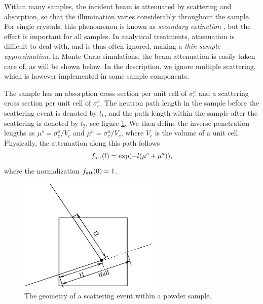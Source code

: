 Within many samples,
the incident beam is attenuated by scattering and absorption,
so that the illumination varies considerably throughout the sample.
For single crystals, this phenomenon is known as
{\em secondary extinction} \cite{bacon}, but the effect is
important for all samples.
In analytical treatments, attenuation is difficult to deal with,
and is thus often ignored, making a {\em thin sample approximation}.
In Monte Carlo simulations, the beam attenuation
is easily taken care of, as will be shown below.
In the description, we ignore multiple scattering, which is however
 implemented in some sample components.

The sample has an absorption cross section per unit cell of
$\sigma_c^a$ and a scattering cross section per unit cell
of $\sigma_c^s$. The neutron path length
in the sample before the scattering event is denoted by $l_1$, and
the path length within the sample after the scattering
is denoted by $l_2$, see figure \ref{powderFig}.
We then define the inverse penetration lengths as
$\mu^s = \sigma_c^s / V_c$ and $\mu^a = \sigma_c^a / V_c$, where
$V_c$ is the volume of a unit cell. Physically, the attenuation
along this path follows
\begin{equation}
f_{\rm att}(l) = \exp(- l (\mu^s + \mu^a)) ,
\end{equation}
where the normalization $f_{\rm att}(0)=1$.

\begin{figure}
  \begin{center}
    \includegraphics[width=0.6\textwidth]{figures/scatter.eps}
  \end{center}
\caption{The geometry of a scattering event within a powder sample.}
\label{powderFig}
\end{figure}

